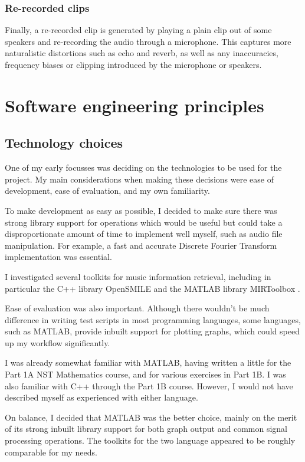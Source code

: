 \documentclass[12pt,a4paper,twoside,openright]{report}
\begin{document}
\subsubsection{Re-recorded clips}

Finally, a re-recorded clip is generated by playing a plain clip out of some speakers and re-recording the audio through a microphone. This captures more naturalistic distortions such as echo and reverb, as well as any inaccuracies, frequency biases or clipping introduced by the microphone or speakers.


\section{Software engineering principles}

\subsection{Technology choices}

One of my early focusses was deciding on the technologies to be used for the project. My main considerations when making these decisions were ease of development, ease of evaluation, and my own familiarity.

To make development as easy as possible, I decided to make sure there was strong library support for operations which would be useful but could take a disproportionate amount of time to implement well myself, such as audio file manipulation. For example, a fast and accurate Discrete Fourier Transform implementation was essential.

I investigated several toolkits for music information retrieval, including in particular the C++ library OpenSMILE \cite{Eyben10} and the MATLAB library MIRToolbox \cite{Lartillot07}.

Ease of evaluation was also important. Although there wouldn't be much difference in writing test scripts in most programming languages, some languages, such as MATLAB, provide inbuilt support for plotting graphs, which could speed up my workflow significantly.

I was already somewhat familiar with MATLAB, having written a little for the Part 1A NST Mathematics course, and for various exercises in Part 1B. I was also familiar with C++ through the Part 1B course. However, I would not have described myself as experienced with either language.

On balance, I decided that MATLAB was the better choice, mainly on the merit of its strong inbuilt library support for both graph output and common signal processing operations. The toolkits for the two language appeared to be roughly comparable for my needs.
\end{document}
